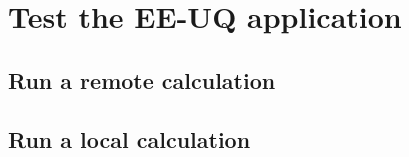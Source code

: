 \section{Test the EE-UQ application}\label{install_test}

\subsection{Run a remote calculation}

\subsection{Run a local calculation}

